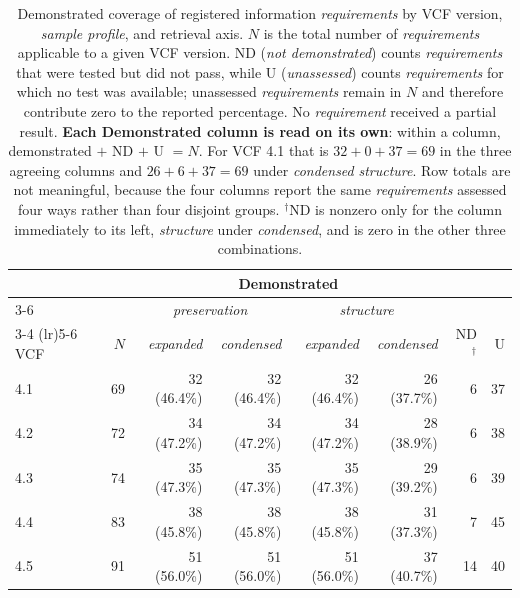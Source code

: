 \begin{table}[htbp]
\centering
\caption{
  Demonstrated coverage of registered information \emph{requirements} by VCF version, \emph{sample profile}, and retrieval axis.
  $N$ is the total number of \emph{requirements} applicable to a given VCF version.
  ND (\emph{not demonstrated}) counts \emph{requirements} that were tested but did not pass, while
  U (\emph{unassessed}) counts \emph{requirements} for which no test was available; unassessed \emph{requirements} remain in $N$ and therefore contribute zero to the reported percentage. No \emph{requirement} received a partial result.
  \textbf{Each Demonstrated column is read on its own}: within a column, demonstrated $+$ ND $+$ U $= N$. For VCF 4.1 that is $32+0+37=69$ in the three agreeing columns and $26+6+37=69$ under \textit{condensed} \emph{structure}.
  Row totals are not meaningful, because the four columns report the same \emph{requirements} assessed four ways rather than four disjoint groups.
  $^{\dagger}$ND is nonzero only for the column immediately to its left, \emph{structure} under \textit{condensed}, and is zero in the other three combinations.
}
\label{tab:requirement-results}
\small
\begin{tabular*}{\linewidth}{@{\extracolsep{\fill}}lrrrrrrr@{}}
\toprule
 & & \multicolumn{4}{c}{Demonstrated} & & \\
\cmidrule(lr){3-6}
 & & \multicolumn{2}{c}{\emph{preservation}} & \multicolumn{2}{c}{\emph{structure}} & & \\
\cmidrule(lr){3-4} \cmidrule(lr){5-6}
VCF & $N$ & \textit{expanded} & \textit{condensed} & \textit{expanded} & \textit{condensed} & ND$^{\dagger}$ & U \\
\midrule
4.1 & 69 & 32 (46.4\%) & 32 (46.4\%) & 32 (46.4\%) & 26 (37.7\%) &  6 & 37 \\
4.2 & 72 & 34 (47.2\%) & 34 (47.2\%) & 34 (47.2\%) & 28 (38.9\%) &  6 & 38 \\
4.3 & 74 & 35 (47.3\%) & 35 (47.3\%) & 35 (47.3\%) & 29 (39.2\%) &  6 & 39 \\
4.4 & 83 & 38 (45.8\%) & 38 (45.8\%) & 38 (45.8\%) & 31 (37.3\%) &  7 & 45 \\
4.5 & 91 & 51 (56.0\%) & 51 (56.0\%) & 51 (56.0\%) & 37 (40.7\%) & 14 & 40 \\
\bottomrule
\end{tabular*}
\end{table}

